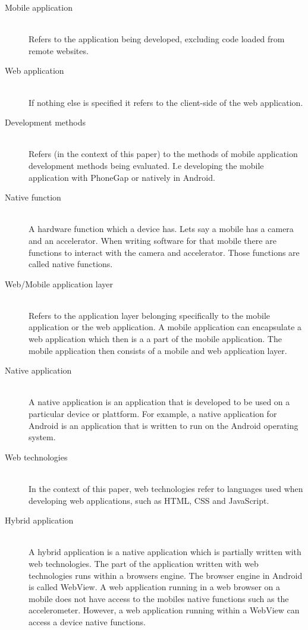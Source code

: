 \begin{description}
  \item[Mobile application] \hfill \\
    Refers to the application being developed, excluding code loaded from remote websites.
  \item[Web application] \hfill \\
    If nothing else is specified it refers to the client-side of the web application.
  \item[Development methods] \hfill \\
    Refers (in the context of this paper) to the methods of mobile application development methods being evaluated. I.e developing the mobile application with PhoneGap or natively in Android.
  \item[Native function] \hfill \\
     A hardware function which a device has. Lets say a mobile has a camera and an accelerator. When writing software for that mobile there are functions to interact with the camera and accelerator. Those functions are called native functions.
  \item[Web/Mobile application layer] \hfill \\
	Refers to the application layer belonging specifically to the mobile application or the web application. A mobile application can encapsulate a web application which then is a a part of the mobile application. The mobile application then consists of a mobile and web application layer.
	\item[Native application] \hfill \\
	A native application is an application that is developed to be used on a particular device or plattform. For example, a native application for Android is an application that is written to run on the Android operating system.
\item[Web technologies] \hfill \\
	In the context of this paper, web technologies refer to languages used when developing web applications, such as HTML, CSS and JavaScript.
\item[Hybrid application] \hfill \\
	A hybrid application is a native application which is partially written with web technologies. The part of the application written with web technologies runs within a browsers engine. The browser engine in Android is called WebView. A web application running in a web browser on a mobile does not have access to the mobiles native functions such as the accelerometer. However, a web application running within a WebView can access a device native functions. 
\end{description}

